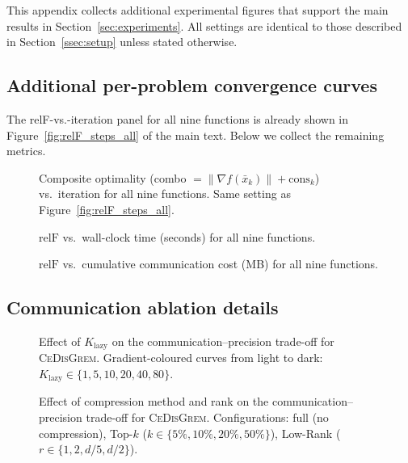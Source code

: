 \documentclass[review,onefignum,onetabnum]{siamart171218}
\begin{document}
This appendix collects additional experimental figures that
support the main results in Section~\ref{sec:experiments}.
All settings are identical to those described in
Section~\ref{ssec:setup} unless stated otherwise.

\subsection{Additional per-problem convergence curves}

The relF-vs.-iteration panel for all nine functions is already shown
in Figure~\ref{fig:relF_steps_all} of the main text.
Below we collect the remaining metrics.

\begin{figure}[htbp]
	\centering
	\caption{Composite optimality (combo $=\|\nabla f(\bar x_k)\|+\mathrm{cons}_k$)
		vs.\ iteration for all nine functions.
		Same setting as Figure~\ref{fig:relF_steps_all}.}
	\label{fig:app_combo_steps}
\end{figure}

\begin{figure}[htbp]
	\centering
	\caption{$\mathrm{relF}$ vs.\ wall-clock time (seconds) for all nine
		functions.}
	\label{fig:app_relF_time}
\end{figure}

\begin{figure}[htbp]
	\centering
	\caption{$\mathrm{relF}$ vs.\ cumulative communication cost (MB) for
		all nine functions.}
	\label{fig:app_relF_comm}
\end{figure}

\subsection{Communication ablation details}

\begin{figure}[htbp]
	\centering
	\caption{Effect of $K_{\mathrm{lazy}}$ on the
		communication--precision trade-off for \textsc{CeDisGrem}.
		Gradient-coloured curves from light to dark:
		$K_{\mathrm{lazy}}\in\{1,5,10,20,40,80\}$.}
	\label{fig:klazy}
\end{figure}

\begin{figure}[htbp]
	\centering
	\caption{Effect of compression method and rank on the
		communication--precision trade-off for \textsc{CeDisGrem}.
		Configurations: full (no compression),
		Top-$k$ ($k\in\{5\%,10\%,20\%,50\%\}$),
		Low-Rank ($r\in\{1,2,d/5,d/2\}$).}
	\label{fig:compress}
\end{figure}
\end{document}
